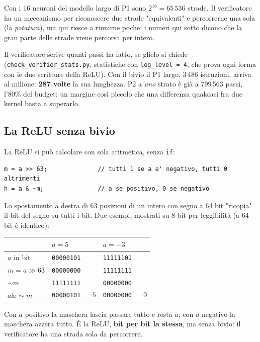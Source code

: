 \documentclass[11pt,a4paper,oneside]{report}
\begin{document}
Con i 16 neuroni del modello largo di P1 sono $2^{16} = 65\,536$ strade. Il
verificatore ha un meccanismo per riconoscere due strade "equivalenti" e
percorrerne una sola (la \emph{potatura}), ma qui riesce a riunirne poche: i
numeri qui sotto dicono che la gran parte delle strade viene percorsa per
intero.

Il verificatore scrive quanti passi ha fatto, se glielo si chiede
(\texttt{check\_verifier\_stats.py}, statistiche con \texttt{log\_level = 4}, che prova
ogni forma con le due scritture della ReLU). Con il bivio il P1 largo, 3\,486
istruzioni, arriva al milione: \textbf{287 volte} la sua lunghezza. P2 a
\emph{uno} strato è già a 799\,563 passi, l'80\% del budget: un margine così
piccolo che una differenza qualsiasi fra due kernel basta a superarlo.

\subsection*{La ReLU senza bivio}

La ReLU si può calcolare con sola aritmetica, senza \texttt{if}:

\begin{lstlisting}
m = a >> 63;              // tutti 1 se a e' negativo, tutti 0 altrimenti
h = a & ~m;               // a se positivo, 0 se negativo
\end{lstlisting}

Lo spostamento a destra di 63 posizioni di un intero con segno a 64 bit
"ricopia" il bit del segno su tutti i bit. Due esempi, mostrati su 8 bit per
leggibilità (a 64 bit è identico):

\begin{center}
\small
\begin{tabular}{@{}lll@{}}
\toprule
& \textbf{$a = 5$} & \textbf{$a = -3$} \\
\midrule
$a$ in bit & \texttt{00000101} & \texttt{11111101} \\
$m = a \gg 63$ & \texttt{00000000} & \texttt{11111111} \\
$\sim m$ & \texttt{11111111} & \texttt{00000000} \\
$a \mathbin{\&} \sim m$ & \texttt{00000101} $= 5$ & \texttt{00000000} $= 0$ \\
\bottomrule
\end{tabular}
\end{center}

Con $a$ positivo la maschera lascia passare tutto e resta $a$; con $a$ negativo
la maschera azzera tutto. È la ReLU, \textbf{bit per bit la stessa}, ma senza
bivio: il verificatore ha una strada sola da percorrere.
\end{document}
